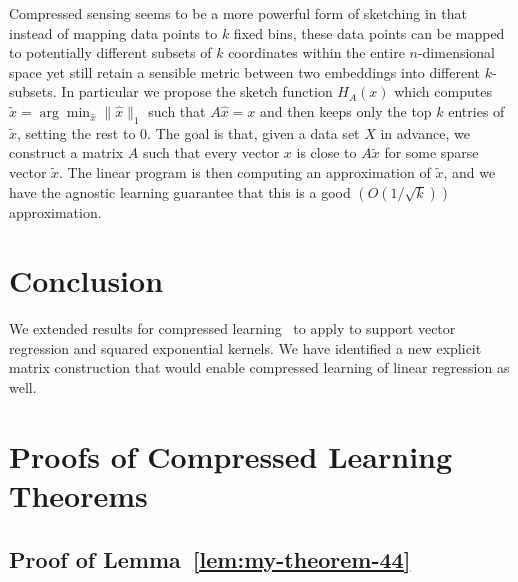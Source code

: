 \documentclass[english]{article}
\theoremstyle{plain}
\begin{document}
Compressed sensing seems to be a more powerful form of sketching in that instead of mapping data points to $k$ fixed bins, these data points can be mapped to potentially different subsets of $k$ coordinates within the entire $n$-dimensional space yet still retain a sensible metric between two embeddings into different $k$-subsets. In particular we propose the sketch function $H_A(x)$ which computes $\tilde{x} = \arg\min_{\hat{x}} \|\hat{x}\|_1$ such that $A\hat{x}=x$ and then keeps only the top $k$ entries of $\tilde{x}$, setting the rest to $0$. The goal is that, given a data set $X$ in advance, we construct a matrix $A$ such that every vector $x$ is close to $A\tilde{x}$ for some sparse vector $\tilde{x}$. The linear program is then computing an approximation of $\tilde{x}$, and we have the agnostic learning guarantee that this is a good $\left(O(1/\sqrt{k})\right)$ approximation. 

\section{Conclusion}
We extended results for compressed learning~\citep{Calderbank09} to apply to support vector regression and squared exponential kernels. We have identified a new explicit matrix construction that would enable compressed learning of linear regression as well.




\appendix
\section{Proofs of Compressed Learning Theorems}

\subsection{Proof of Lemma~\ref{lem:my-theorem-44}}
\label{app:my-theorem-44-proof}
\end{document}
